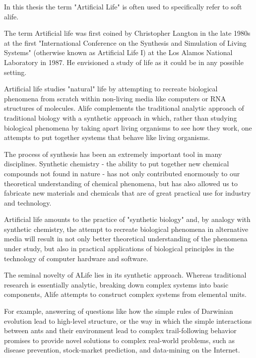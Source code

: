 \documentclass[a4paper,12pt]{report}
\begin{document}
In this thesis the term "Artificial Life" is often used to specifically refer to soft alife.

The term Artificial life was first coined by Christopher Langton in the late 1980s at the first "International Conference on the Synthesis and Simulation of Living Systems" (otherwise known as Artificial Life I) at the Los Alamos National Laboratory in 1987. He envisioned a study of life as it could be in any possible setting.

Artificial life studies "natural" life by attempting to recreate biological phenomena from scratch within non-living media like computers or RNA structures of molecules. Alife complements the traditional analytic approach of traditional biology with a synthetic approach in which, rather than studying biological phenomena by taking apart living organisms to see how they work, one attempts to put together systems that behave like living organisms.

The process of synthesis has been an extremely important tool in many disciplines. Synthetic chemistry - the ability to put together new chemical compounds not found in nature - has not only contributed enormously to our theoretical understanding of chemical phenomena, but has also allowed us to fabricate new materials and chemicals that are of great practical use for industry and technology.

Artificial life amounts to the practice of "synthetic biology" and, by analogy with synthetic chemistry, the attempt to recreate biological phenomena in alternative media will result in not only better theoretical understanding of the phenomena under study, but also in practical applications of biological principles in the technology of computer hardware and software.\cite{Langton} 

The seminal novelty of ALife lies in its synthetic approach. Whereas traditional research is essentially analytic, breaking down complex systems into basic components, Alife attempts to construct complex systems from elemental units.\cite{BornhoffenLataud}

For example, answering of questions like how the simple rules of Darwinian evolution lead to high-level structure, or the way in which the simple interactions between ants and their environment lead to complex trail-following behavior promises to provide novel solutions to complex real-world problems, such as disease prevention, stock-market prediction, and data-mining on the Internet.\cite{AdamiBrown}
\end{document}
